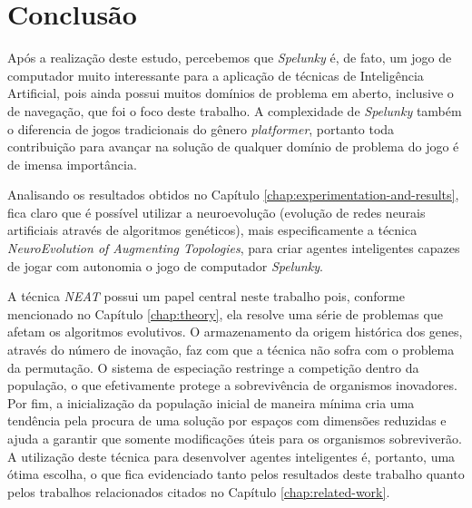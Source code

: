 \chapter{\label{chap:conclusion}Conclusão}



Após a realização deste estudo, percebemos que \textit{Spelunky} é, de fato, um
jogo de computador muito interessante para a aplicação de técnicas de
Inteligência Artificial, pois ainda possui muitos domínios de problema em
aberto, inclusive o de navegação, que foi o foco deste trabalho. A complexidade
de \textit{Spelunky} também o diferencia de jogos tradicionais do gênero
\textit{platformer}, portanto toda contribuição para avançar na solução de
qualquer domínio de problema do jogo é de imensa importância.

Analisando os resultados obtidos no Capítulo
\ref{chap:experimentation-and-results}, fica claro que é possível utilizar a
neuroevolução (evolução de redes neurais artificiais através de algoritmos
genéticos), mais especificamente a técnica \textit{NeuroEvolution of Augmenting
Topologies}, para criar agentes inteligentes capazes de jogar com autonomia o
jogo de computador \textit{Spelunky}.

A técnica \textit{NEAT} possui um papel central neste trabalho pois, conforme
mencionado no Capítulo \ref{chap:theory}, ela resolve uma série de problemas que
afetam os algoritmos evolutivos. O armazenamento da origem histórica dos genes,
através do número de inovação, faz com que a técnica não sofra com o problema da
permutação. O sistema de especiação restringe a competição dentro da população,
o que efetivamente protege a sobrevivência de organismos inovadores. Por fim, a
inicialização da população inicial de maneira mínima cria uma tendência pela
procura de uma solução por espaços com dimensões reduzidas e ajuda a garantir
que somente modificações úteis para os organismos sobreviverão.  A utilização
deste técnica para desenvolver agentes inteligentes é, portanto, uma ótima
escolha, o que fica evidenciado tanto pelos resultados deste trabalho quanto
pelos trabalhos relacionados citados no Capítulo \ref{chap:related-work}.


